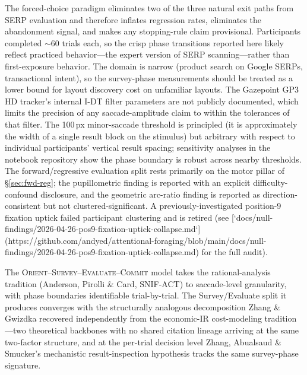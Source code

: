 \documentclass[10pt,twocolumn,letterpaper]{article}
\makeatletter
\renewcommand\section{\@startsection{section}{1}{\z@}{5pt}{2pt}{\normalfont\bfseries\normalsize}}
\renewcommand\subsection{\@startsection{subsection}{2}{\z@}{3pt}{1.5pt}{\normalfont\bfseries\small}}
\makeatother
\begin{document}
\subsection{Limitations}
The forced-choice paradigm eliminates two of the three natural exit paths from SERP evaluation and therefore inflates regression rates, eliminates the abandonment signal, and makes any stopping-rule claim provisional. Participants completed $\sim$60 trials each, so the crisp phase transitions reported here likely reflect practiced behavior---the expert version of SERP scanning---rather than first-exposure behavior. The domain is narrow (product search on Google SERPs, transactional intent), so the survey-phase measurements should be treated as a lower bound for layout discovery cost on unfamiliar layouts. The Gazepoint GP3 HD tracker's internal I-DT filter parameters are not publicly documented, which limits the precision of any saccade-amplitude claim to within the tolerances of that filter. The 100\,px minor-saccade threshold is principled (it is approximately the width of a single result block on the stimulus) but arbitrary with respect to individual participants' vertical result spacing; sensitivity analyses in the notebook repository show the phase boundary is robust across nearby thresholds. The forward/regressive evaluation split rests primarily on the motor pillar of \S\ref{sec:fwd-reg}; the pupillometric finding is reported with an explicit difficulty-confound disclosure, and the geometric arc-ratio finding is reported as direction-consistent but not clustered-significant. A previously-investigated position-9 fixation uptick failed participant clustering and is retired (see [`docs/null-findings/2026-04-26-pos9-fixation-uptick-collapse.md`](https://github.com/andyed/attentional-foraging/blob/main/docs/null-findings/2026-04-26-pos9-fixation-uptick-collapse.md) for the full audit).

\section{Conclusion}

The \textsc{Orient}--\textsc{Survey}--\textsc{Evaluate}--\textsc{Commit} model takes the rational-analysis tradition (Anderson, Pirolli \& Card, SNIF-ACT) to saccade-level granularity, with phase boundaries identifiable trial-by-trial. The Survey/Evaluate split it produces converges with the structurally analogous decomposition Zhang \& Gwizdka recovered independently from the economic-IR cost-modeling tradition---two theoretical backbones with no shared citation lineage arriving at the same two-factor structure, and at the per-trial decision level Zhang, Abualsaud \& Smucker's mechanistic result-inspection hypothesis tracks the same survey-phase signature.
\end{document}
